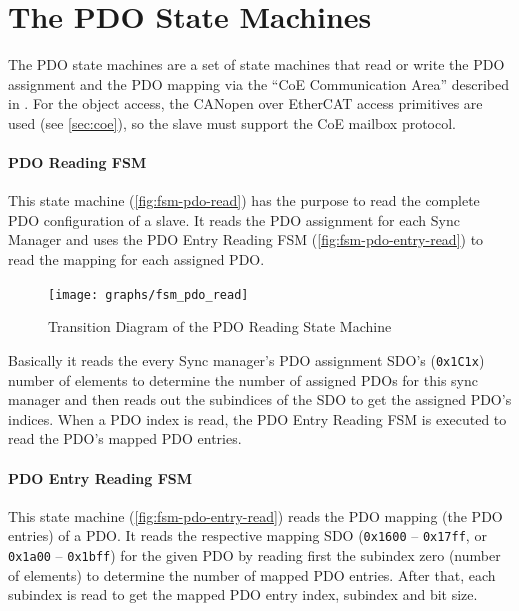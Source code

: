 \documentclass[a4paper,12pt,BCOR6mm,bibtotoc,idxtotoc]{scrbook}
\begin{document}

\section{The PDO State Machines}
\label{sec:fsm-pdo}

The PDO state machines are a set of state machines that read or write the PDO
assignment and the PDO mapping via the ``CoE Communication Area'' described in
\cite[sec. 5.6.7.4]{alspec}. For the object access, the CANopen over EtherCAT
access primitives are used (see \autoref{sec:coe}), so the slave must support
the CoE mailbox protocol.

\paragraph{PDO Reading FSM} This state machine (\autoref{fig:fsm-pdo-read})
has the purpose to read the complete PDO configuration of a slave. It reads
the PDO assignment for each Sync Manager and uses the PDO Entry Reading FSM
(\autoref{fig:fsm-pdo-entry-read}) to read the mapping for each assigned PDO.

\begin{figure}[htbp]
  \centering
  \texttt{[image: graphs/fsm\_pdo\_read]}
  \caption{Transition Diagram of the PDO Reading State Machine}
  \label{fig:fsm-pdo-read}
\end{figure}

Basically it reads the every Sync manager's PDO assignment SDO's
(\lstinline+0x1C1x+) number of elements to determine the number of assigned
PDOs for this sync manager and then reads out the subindices of the SDO to get
the assigned PDO's indices. When a PDO index is read, the PDO Entry Reading
FSM is executed to read the PDO's mapped PDO entries.

\paragraph{PDO Entry Reading FSM} This state machine
(\autoref{fig:fsm-pdo-entry-read}) reads the PDO mapping (the PDO entries) of
a PDO. It reads the respective mapping SDO (\lstinline+0x1600+ --
\lstinline+0x17ff+, or \lstinline+0x1a00+ -- \lstinline+0x1bff+) for the given
PDO by reading first the subindex zero (number of elements) to determine the
number of mapped PDO entries. After that, each subindex is read to get the
mapped PDO entry index, subindex and bit size.
\end{document}
